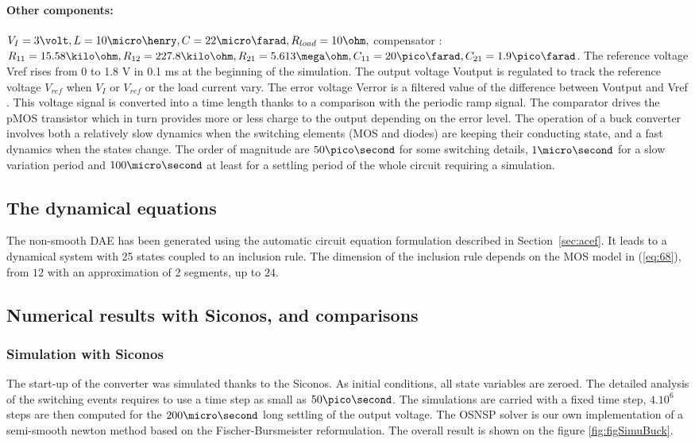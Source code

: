 \paragraph{Other components:} $V_I = 3 \volt , L = 10 \micro\henry, C = 22 \micro \farad, R_{load} = 10\ohm,$ compensator
: $R_{11} = 15.58 \kilo \ohm , R_{12} = 227.8 \kilo \ohm ,R_{21} = 5.613 \mega \ohm, C_{11} = 20 \pico \farad, C_{21} =
1.9 \pico \farad$.
The reference voltage Vref rises from 0 to 1.8 V in 0.1 ms at the beginning
of the simulation.
The output voltage Voutput is regulated to track the reference voltage $V_{ref}$ when
$V_I$ or $V_{ref}$ or the load current vary. The error voltage Verror is a filtered value
of the difference between Voutput and Vref . This voltage signal is converted
into a time length thanks to a comparison with the periodic ramp signal. The
comparator drives the pMOS transistor which in turn provides more or less
charge to the output depending on the error level. The operation of a buck
converter involves both a relatively slow dynamics when the switching elements
(MOS and diodes) are keeping their conducting state, and a fast dynamics when
the states change. The order of magnitude are $ 50 \pico \second$ for some switching details,
$1 \micro \second$ for a slow variation period and $100 \micro \second$ at least for a settling period of the
whole circuit requiring a simulation.

\subsection{The dynamical equations}
\label{section41}
The non-smooth DAE has been generated using the automatic circuit equation formulation described in Section~\ref{sec:acef}. It leads to a dynamical system with 25 states coupled to an inclusion rule. The dimension of the inclusion
rule depends on the MOS model in (\ref{eq:68}), from $12$ with an approximation of 2 segments, up to $24$.  

\subsection{Numerical results with {\sc Siconos},  and comparisons}
\label{section42}
\subsubsection{Simulation with {\sc Siconos}}
 The start-up of the converter was simulated thanks to the {\sc Siconos}. As initial conditions, all state variables are zeroed.
The detailed analysis of the switching events requires to use a time step as
small as $50 \pico \second$. The simulations are carried with a fixed time step, $4.10^{6}$ steps are then computed for the $200 \micro \second$ long settling of the output voltage. The OSNSP solver is our own implementation of a semi-smooth newton method based on the Fischer-Bursmeister reformulation\cite{Deluca.ea1996}.
The overall result is shown on the figure \ref{fig:figSimuBuck}.  


